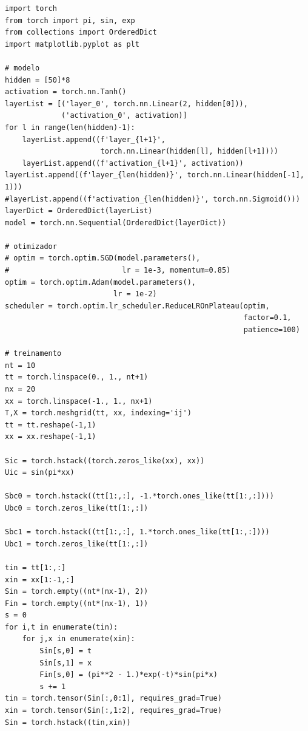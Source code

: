     


\begin{lstlisting}[caption=mlp\_calor\_autograd.py]
import torch
from torch import pi, sin, exp
from collections import OrderedDict
import matplotlib.pyplot as plt

# modelo
hidden = [50]*8
activation = torch.nn.Tanh()
layerList = [('layer_0', torch.nn.Linear(2, hidden[0])),
             ('activation_0', activation)]
for l in range(len(hidden)-1):
    layerList.append((f'layer_{l+1}',
                      torch.nn.Linear(hidden[l], hidden[l+1])))
    layerList.append((f'activation_{l+1}', activation))
layerList.append((f'layer_{len(hidden)}', torch.nn.Linear(hidden[-1], 1)))
#layerList.append((f'activation_{len(hidden)}', torch.nn.Sigmoid()))
layerDict = OrderedDict(layerList)
model = torch.nn.Sequential(OrderedDict(layerDict))

# otimizador
# optim = torch.optim.SGD(model.parameters(),
#                          lr = 1e-3, momentum=0.85)
optim = torch.optim.Adam(model.parameters(),
                         lr = 1e-2)
scheduler = torch.optim.lr_scheduler.ReduceLROnPlateau(optim,
                                                       factor=0.1,
                                                       patience=100)

# treinamento
nt = 10
tt = torch.linspace(0., 1., nt+1)
nx = 20
xx = torch.linspace(-1., 1., nx+1)
T,X = torch.meshgrid(tt, xx, indexing='ij')
tt = tt.reshape(-1,1)
xx = xx.reshape(-1,1)

Sic = torch.hstack((torch.zeros_like(xx), xx))
Uic = sin(pi*xx)

Sbc0 = torch.hstack((tt[1:,:], -1.*torch.ones_like(tt[1:,:])))
Ubc0 = torch.zeros_like(tt[1:,:])

Sbc1 = torch.hstack((tt[1:,:], 1.*torch.ones_like(tt[1:,:])))
Ubc1 = torch.zeros_like(tt[1:,:])

tin = tt[1:,:]
xin = xx[1:-1,:]
Sin = torch.empty((nt*(nx-1), 2))
Fin = torch.empty((nt*(nx-1), 1))
s = 0
for i,t in enumerate(tin):
    for j,x in enumerate(xin):
        Sin[s,0] = t
        Sin[s,1] = x
        Fin[s,0] = (pi**2 - 1.)*exp(-t)*sin(pi*x)
        s += 1
tin = torch.tensor(Sin[:,0:1], requires_grad=True)
xin = torch.tensor(Sin[:,1:2], requires_grad=True)
Sin = torch.hstack((tin,xin))


\end{lstlisting}
